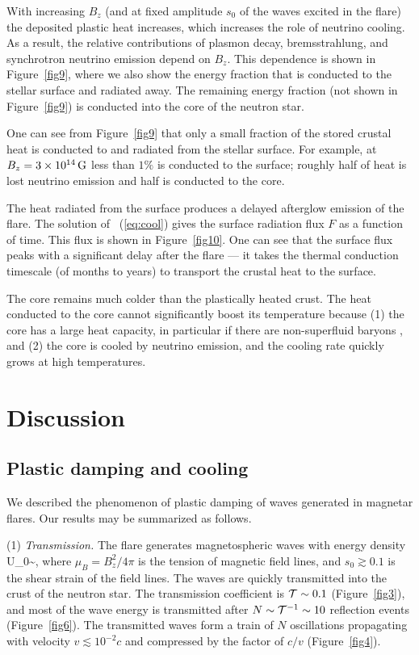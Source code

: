 With increasing $B_z$ (and at fixed amplitude $s_0$ of the waves excited in the flare) the deposited plastic heat increases, which increases the role of neutrino cooling.
As a result, the relative contributions of plasmon decay, bremsstrahlung, and synchrotron neutrino emission depend on $B_z$. 
This dependence is shown in Figure~\ref{fig9}, where we also show the energy fraction that is conducted to the stellar surface and radiated away. 
The remaining energy fraction (not shown in Figure~\ref{fig9}) is conducted into the core of the neutron star.

One can see from Figure~\ref{fig9} that only a small fraction of the stored crustal heat is conducted to and radiated from the stellar surface.
For example, at $B_z=3\times 10^{14}\,\rm G$ less than $1\%$ is conducted to the surface; roughly half of heat is lost neutrino emission and half is conducted to the core.

The heat radiated from the surface produces a delayed afterglow emission of the flare.
The solution of \Eq~(\ref{eq:cool}) gives the surface radiation flux $F$ as a function of time. 
This flux is shown in Figure~\ref{fig10}. 
One can see that the surface flux peaks with a significant delay after the flare --- it takes the thermal conduction timescale (of months to years) to transport the crustal heat to the surface.

The core remains much colder than the plastically heated crust. The heat conducted to the core cannot significantly boost its temperature because (1) the core has a large heat capacity, in particular if there are non-superfluid baryons \citep{2004ARA&A..42..169Y}, and (2) the core is cooled by neutrino emission, and the cooling rate quickly grows at high temperatures.

\section{Discussion}


\subsection{Plastic damping and cooling}

We described the phenomenon of plastic damping of \alfven waves 
generated in magnetar flares. Our results may be summarized as follows.

(1) {\it Transmission.}
The flare generates magnetospheric \alfven waves with energy density 
\beq
  U_0\sim {},
\eeq
where $\mu_B=B_z^2/4\pi$ is the tension of magnetic field lines, and $s_0\gtrsim 0.1$ is the shear strain of the field lines. The waves are quickly transmitted into the crust of the neutron star. 
The transmission coefficient is ${\mathcal T}\sim 0.1$ (Figure~\ref{fig3}), and most of the wave energy is transmitted after $N\sim {\mathcal T}^{-1} \sim 10$ reflection events (Figure~\ref{fig6}).
The transmitted waves form a train of $N$ oscillations propagating with velocity $v\lesssim 10^{-2}c$ and compressed by the factor of $c/v$ (Figure~\ref{fig4}).

